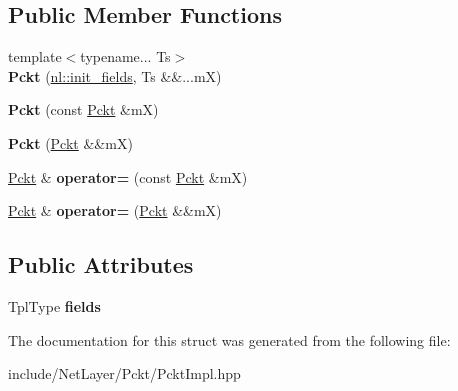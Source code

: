 \subsection*{Public Member Functions}
\begin{DoxyCompactItemize}
\item 
\hypertarget{structnl_1_1impl_1_1Pckt_a40beeef4aa8d787f714779139f13e525}{}{\footnotesize template$<$typename... Ts$>$ }\\{\bfseries Pckt} (\hyperlink{structnl_1_1init__fields}{nl\+::init\+\_\+fields}, Ts \&\&...m\+X)\label{structnl_1_1impl_1_1Pckt_a40beeef4aa8d787f714779139f13e525}

\item 
\hypertarget{structnl_1_1impl_1_1Pckt_a192a758292a9f2477fc26c3c6362a5e6}{}{\bfseries Pckt} (const \hyperlink{structnl_1_1impl_1_1Pckt}{Pckt} \&m\+X)\label{structnl_1_1impl_1_1Pckt_a192a758292a9f2477fc26c3c6362a5e6}

\item 
\hypertarget{structnl_1_1impl_1_1Pckt_a027967cfeb8de8ccfb78b641b38fcbaa}{}{\bfseries Pckt} (\hyperlink{structnl_1_1impl_1_1Pckt}{Pckt} \&\&m\+X)\label{structnl_1_1impl_1_1Pckt_a027967cfeb8de8ccfb78b641b38fcbaa}

\item 
\hypertarget{structnl_1_1impl_1_1Pckt_a7f4b332d332e5bbcb03a539b9486b314}{}\hyperlink{structnl_1_1impl_1_1Pckt}{Pckt} \& {\bfseries operator=} (const \hyperlink{structnl_1_1impl_1_1Pckt}{Pckt} \&m\+X)\label{structnl_1_1impl_1_1Pckt_a7f4b332d332e5bbcb03a539b9486b314}

\item 
\hypertarget{structnl_1_1impl_1_1Pckt_acb484b18d906024bd251c4ab8d057923}{}\hyperlink{structnl_1_1impl_1_1Pckt}{Pckt} \& {\bfseries operator=} (\hyperlink{structnl_1_1impl_1_1Pckt}{Pckt} \&\&m\+X)\label{structnl_1_1impl_1_1Pckt_acb484b18d906024bd251c4ab8d057923}

\end{DoxyCompactItemize}
\subsection*{Public Attributes}
\begin{DoxyCompactItemize}
\item 
\hypertarget{structnl_1_1impl_1_1Pckt_a2ac6777ba49d071e03c3413b9d023212}{}Tpl\+Type {\bfseries fields}\label{structnl_1_1impl_1_1Pckt_a2ac6777ba49d071e03c3413b9d023212}

\end{DoxyCompactItemize}


The documentation for this struct was generated from the following file\+:\begin{DoxyCompactItemize}
\item 
include/\+Net\+Layer/\+Pckt/Pckt\+Impl.\+hpp\end{DoxyCompactItemize}
